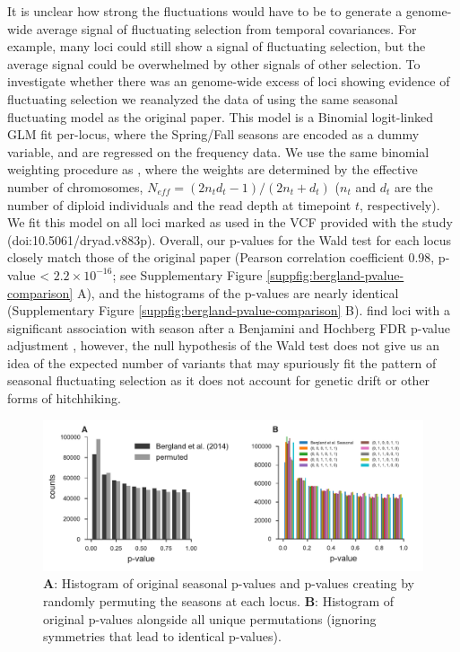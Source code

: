 \documentclass[11pt]{article}
\begin{document}
It is unclear how strong the fluctuations would have to be to generate a
genome-wide average signal of fluctuating selection from temporal covariances.
For example, many loci could still show a signal of fluctuating selection, but
the average signal could be overwhelmed by other signals of other selection. To
investigate whether there was an genome-wide excess of loci showing evidence of
fluctuating selection we reanalyzed the data of \parencite{Bergland2014-ij}
using the same seasonal fluctuating model as the original paper. This model is
a Binomial logit-linked GLM fit per-locus, where the Spring/Fall seasons are
encoded as a dummy variable, and are regressed on the frequency data. We use
the same binomial weighting procedure as \textcite{Bergland2014-ij}, where the
weights are determined by the effective number of chromosomes, $N_{eff} = (2
n_t d_t - 1) / (2 n_t + d_t)$ ($n_t$ and $d_t$ are the number of diploid
individuals and the read depth at timepoint $t$, respectively). We fit this
model on all loci marked as used in the VCF provided with the
\textcite{Bergland2014-ij} study (doi:10.5061/dryad.v883p). Overall, our
p-values for the Wald test for each locus closely match those of the original
paper (Pearson correlation coefficient 0.98, p-value < $2.2 \times 10^{-16}$;
see Supplementary Figure \ref{suppfig:bergland-pvalue-comparison} A), and the
histograms of the p-values are nearly identical (Supplementary Figure
\ref{suppfig:bergland-pvalue-comparison} B). \textcite{Bergland2014-ij} find
loci with a significant association with season after a Benjamini and Hochberg
FDR p-value adjustment \parencite{Benjamini1995-jy}, however, the null
hypothesis of the Wald test does not give us an idea of the expected number of
variants that may spuriously fit the pattern of seasonal fluctuating selection
as it does not account for genetic drift or other forms of hitchhiking.

\begin{figure}[!ht]
  \centering
  \includegraphics[width=\textwidth]{figures/bergland-combined-hists.pdf}

  \caption{\textbf{A}: Histogram of original \textcite{Bergland2014-ij}
    seasonal p-values and p-values creating by randomly permuting the seasons
    at each locus. \textbf{B}: Histogram of original \textcite{Bergland2014-ij}
    p-values alongside all unique permutations (ignoring symmetries that lead
    to identical p-values).}

  \label{suppfig:bergland-pvalue-hist}
\end{figure}
\end{document}
